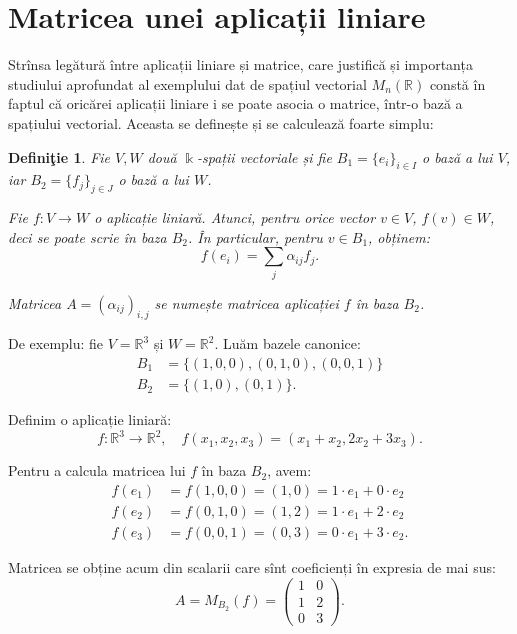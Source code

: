 \documentclass[11pt,a4paper]{article}
\newcommand\RR{\mathbb{R}}
\theoremstyle{dotless}
\theoremstyle{dotlessdr}
\newtheorem{definition}{Defini\c{t}ie}[section]
\begin{document}

\section{Matricea unei aplicații liniare}
\label{sec:matrice-apl-lin}

Strînsa legătură între aplicații liniare și matrice, care justifică și importanța
studiului aprofundat al exemplului dat de spațiul vectorial $M_n(\RR)$ constă
în faptul că oricărei aplicații liniare i se poate asocia o matrice, într-o bază
a spațiului vectorial. Aceasta se definește și se calculează foarte simplu:

\begin{definition}\label{def:matrice-apl-lin}
  Fie $V, W$ două $\Bbbk$-spații vectoriale și fie $B_1 = \{ e_i \}_{i \in I}$
  o bază a lui $V$, iar $B_2 = \{ f_j \}_{j \in J}$ o bază a lui $W$.

  Fie $f : V \to W$ o aplicație liniară. Atunci, pentru orice vector $v \in V$,
  $f(v) \in W$, deci se poate scrie în baza $B_2$. În particular, pentru $v \in B_1$,
  obținem:
  \[
    f(e_i) = \sum_j \alpha_{ij} f_j.
  \]

  Matricea $A = (\alpha_{ij})_{i,j}$ se numește \emph{matricea aplicației $f$ în baza $B_2$}.
\end{definition}

De exemplu: fie $V = \RR^3$ și $W = \RR^2$. Luăm bazele canonice:
\begin{align*}
  B_1 &= \{ (1, 0, 0), (0, 1, 0), (0, 0, 1) \} \\
  B_2 &= \{ (1, 0), (0, 1) \}.
\end{align*}

Definim o aplicație liniară:
\[
  f : \RR^3 \to \RR^2, \quad f(x_1, x_2, x_3) = (x_1 + x_2, 2x_2 + 3x_3).
\]

Pentru a calcula matricea lui $f$ în baza $B_2$, avem:
\begin{align*}
  f(e_1) &= f(1, 0, 0) = (1, 0) = 1 \cdot e_1 + 0 \cdot e_2 \\
  f(e_2) &= f(0, 1, 0) = (1, 2) = 1 \cdot e_1 + 2 \cdot e_2 \\
  f(e_3) &= f(0, 0, 1) = (0, 3) = 0 \cdot e_1 + 3 \cdot e_2.
\end{align*}

Matricea se obține acum din scalarii care sînt coeficienți în expresia de mai sus:
\[
  A = M_{B_2}(f) =
  \begin{pmatrix}
    1 & 0 \\
    1 & 2 \\
    0 & 3
  \end{pmatrix}.
\]
\end{document}
